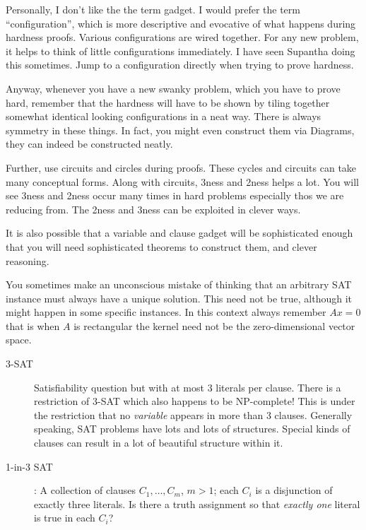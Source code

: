 Personally, I don't like the the term gadget. I would prefer the term ``configuration'', which is more 
descriptive and evocative of what happens during hardness proofs. Various configurations are wired together. 
For any new problem, it helps to think of little configurations immediately. I have seen Supantha doing this 
sometimes. Jump to a configuration directly when trying to prove hardness. 

Anyway, whenever you have a new swanky problem, which you have to prove hard, remember that the hardness 
will have to be shown by tiling together somewhat identical looking configurations in a neat way. There 
is always symmetry in these things. In fact, you might even construct them via Diagrams, they can indeed 
be constructed neatly. 

Further, use circuits and circles during proofs. These cycles and circuits can take many conceptual forms. 
Along with circuits, 3ness and 2ness helps a lot. You will see 3ness and 2ness occur many times in hard problems
especially thos we are reducing from. The 2ness and 3ness can be exploited in clever ways. 

It is also possible that a variable and clause gadget will be sophisticated enough that you will need 
sophisticated theorems to construct them, and clever reasoning. 

You sometimes make an unconscious mistake of thinking that an arbitrary SAT instance must always have a unique 
solution. This need not be true, although it might happen in some specific instances. In this context always 
remember \(Ax=0\) that is when \(A\) is rectangular the kernel need not be the zero-dimensional vector space. 

\begin{description}
\item[{3-SAT}] Satisfiability question but with at most 3 literals per clause. There is a restriction of 3-SAT 
	 which also happens to be NP-complete! This is under the restriction that no \emph{variable} appears 
	 in more than 3 clauses. 
Generally speaking, SAT problems have lots and lots of structures. Special kinds of clauses can result in a lot 
of beautiful structure within it.
\end{description}


\begin{description}
\item[{1-in-3 SAT}] : A collection of clauses \(C_1, \ldots, C_m\), \(m > 1\); each \(C_i\)
is a disjunction of exactly three literals. Is there a truth assignment
so that \emph{exactly one} literal is true in each \(C_i\)?
\end{description}



